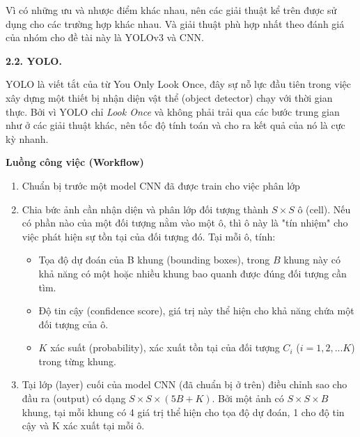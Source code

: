 \documentclass{report}
\begin{document}
Vì có những ưu và nhược điểm khác nhau, nên các giải thuật kể trên được sử dụng cho các trường hợp khác nhau. Và giải thuật phù hợp nhất theo đánh giá của nhóm cho đề tài này là YOLOv3 và CNN. 

\bigskip
\changefontsizes{14pt}
\setlength{\parindent}{0.0cm}
\textbf{2.2. YOLO.}


\smallskip
\changefontsizes{13pt}


\setlength{\parindent}{1cm}
YOLO là viết tắt của từ You Only Look Once, đây sự nỗ lực đầu tiên trong việc xây dựng một thiết bị nhận diện vật thể (object detector) chạy với thời gian thực. Bởi vì YOLO chỉ \textit{Look Once} và không phải trải qua các bước trung gian như ở các giải thuật khác, nên tốc độ tính toán và cho ra kết quả của nó là cực kỳ nhanh.


\setlength{\parindent}{0.5cm}
\bigskip
\textbf{Luồng công việc (Workflow)}

\vspace{-0.35cm}
\begin{enumerate}
	\item Chuẩn bị trước một model CNN đã được train cho việc phân lớp
	\vspace{-0.25cm}
	\item Chia bức ảnh cần nhận diện và phân lớp đối tượng thành $S \times S$ ô (cell). Nếu có phần nào của một đối tượng nằm vào một ô, thì ô này là "tín nhiệm" cho việc phát hiện sự tồn tại của đối tượng đó. Tại mỗi ô, tính:
	
	\vspace{-0.35cm}
	 \begin{itemize}
	 	\item Tọa độ dự đoán của B khung (bounding boxes), trong $ B $ khung này có khả năng có một hoặc nhiều khung bao quanh được đúng đối tượng cần tìm.
	 	\vspace{-0.1cm}
	 	\item Độ tin cậy (confidence score), giá trị này thể hiện cho khả năng chứa một đối tượng của ô.
	 	\vspace{-0.1cm}
	 	\item $ K $ xác suất (probability), xác xuất tồn tại của đối tượng $C_i$ ($ i = 1,2,...K $) trong từng khung.
	 \end{itemize}
 	
 	\vspace{-0.5cm}
 	\item Tại lớp (layer) cuối của model CNN (đã chuẩn bị ở trên) điều chỉnh sao cho đầu ra (output) có dạng $ S \times S \times (5B + K) $. Bởi một ảnh có $ S \times S \times B$ khung, tại mỗi khung có 4 giá trị thể hiện cho tọa độ dự đoán, 1 cho độ tin cậy và K xác xuất tại mỗi ô.
\end{enumerate}
\end{document}
